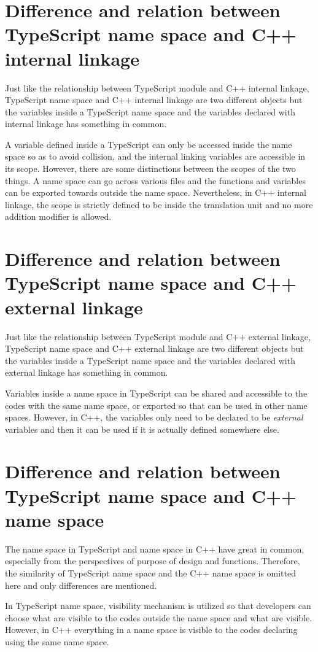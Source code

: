 \documentclass[a4paper]{report}
\begin{document}
\section{Difference and relation between TypeScript name space and C++ internal linkage}
Just like the relationship between TypeScript module and C++ internal linkage, TypeScript name space and C++ internal linkage are two different objects but the variables inside a TypeScript name space and the variables declared with internal linkage has something in common.
\par
A variable defined inside a TypeScript can only be accessed inside the name space so as to avoid collision, and the internal linking variables are accessible in its scope. However, there are some distinctions between the scopes of the two things. A name space can go across various files and the functions and variables can be exported towards outside the name space. Nevertheless, in C++ internal linkage, the scope is strictly defined to be inside the translation unit and no more addition modifier is allowed.
\section{Difference and relation between TypeScript name space and C++ external linkage}
Just like the relationship between TypeScript module and C++ external linkage, TypeScript name space and C++ external linkage are two different objects but the variables inside a TypeScript name space and the variables declared with external linkage has something in common.
\par
Variables inside a name space in TypeScript can be shared and accessible to the codes with the same name space, or exported so that can be used in other name spaces. However, in C++, the variables only need to be declared to be \emph{external} variables and then it can be used if it is actually defined somewhere else. 
\section{Difference and relation between TypeScript name space and C++ name space}
The name space in TypeScript and name space in C++ have great in common, especially from the perspectives of purpose of design and functions. Therefore, the similarity of TypeScript name space and the C++ name space is omitted here and only differences are mentioned.
\par
In TypeScript name space, visibility mechanism is utilized so that developers can choose what are visible to the codes outside the name space and what are visible. However, in C++ everything in a name space is visible to the codes declaring using the same name space.
\end{document}
